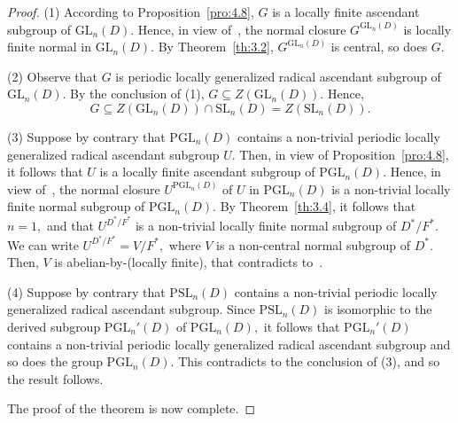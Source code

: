 \documentclass{amsart}
\theoremstyle{definition}
\begin{document}
\begin{proof} (1) According to Proposition~\ref{pro:4.8}, $G$ is a locally finite ascendant subgroup of $\mathrm{GL}_n(D)$. Hence, in view of~\cite[Proposition 1.2.15]{Bo_Dixon_2017}, the normal closure $G^{\mathrm{GL}_n(D)}$ is locally finite normal in $\mathrm{GL}_n(D).$ By Theorem~\ref{th:3.2}, $G^{\mathrm{GL}_n(D)}$ is central, so does $G.$
	
(2) Observe that $G$ is periodic locally generalized radical ascendant subgroup of $\mathrm{GL}_n(D).$ By the conclusion of (1), $G\subseteq Z(\mathrm{GL}_n(D)).$ Hence, $$G\subseteq Z(\mathrm{GL}_n(D))\cap \mathrm{SL}_n(D)=Z(\mathrm{SL}_n(D)).$$
	
(3) Suppose by contrary that $\mathrm{PGL}_n(D)$ contains a non-trivial periodic locally generalized radical ascendant subgroup $U$. Then, in view of Proposition~\ref{pro:4.8}, it follows that $U$ is a locally finite ascendant subgroup of $\mathrm{PGL}_n(D)$. Hence, in view of~\cite[Proposition 1.2.15]{Bo_Dixon_2017}, the normal closure $U^{\mathrm{PGL}_n(D)}$ of $U$ in $\mathrm{PGL}_n(D)$ is a non-trivial locally finite normal subgroup of $\mathrm{PGL}_n(D).$ By Theorem~\ref{th:3.4}, it follows that $n=1,$ and that $U^{D^*/F^*}$ is a non-trivial locally finite normal subgroup of $D^*/F^*.$ We can write $U^{D^*/F^*}=V/F^*,$ where $V$ is a non-central normal subgroup of $D^*.$ Then, $V$ is abelian-by-(locally finite), that contradicts to~\cite[Theorem 2.6]{Pa_ChNaHa_24}. 
	
(4) Suppose by contrary that $\mathrm{PSL}_n(D)$ contains a non-trivial periodic locally generalized radical ascendant subgroup. Since $\mathrm{PSL}_n(D)$ is isomorphic to the derived subgroup $\mathrm{PGL}_n'(D)$ of $\mathrm{PGL}_n(D),$ it follows that $\mathrm{PGL}_n'(D)$ contains a non-trivial periodic locally generalized radical ascendant subgroup and so does the group $\mathrm{PGL}_n(D).$ This contradicts to the conclusion of (3), and so the result follows. 
	
	The proof of the theorem is now complete.
\end{proof}
\end{document}
